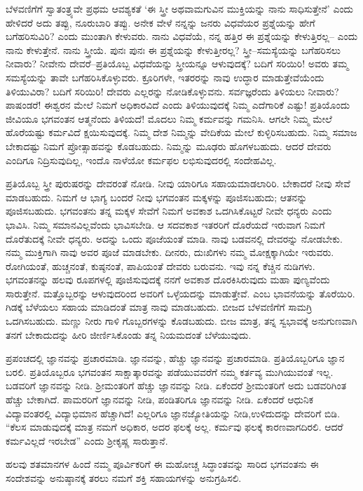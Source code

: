 ಬೆಳವಣಿಗೆಗೆ ಸ್ವಾತಂತ್ರ್ಯವೇ ಪ್ರಥಮ ಆವಶ್ಯಕತೆ ‘ಈ ಸ್ತ್ರೀ ಅಥವಾ\break ಮಗುವಿನ ಮುಕ್ತಿಯನ್ನು ನಾನು ಸಾಧಿಸುತ್ತೇನೆ’ ಎಂದು ಹೇಳಿದರೆ ಅದು ತಪ್ಪು, ನೂರುಬಾರಿ ತಪ್ಪು. ಅನೇಕ ವೇಳೆ ನನ್ನನ್ನು ಜನರು ವಿಧವೆಯರ ಪ್ರಶ್ನೆಯನ್ನು ಹೇಗೆ ಬಗೆಹರಿಸುವಿರಿ? ಎಂದು ಮುಂತಾಗಿ ಕೇಳುವರು. ನಾನು ವಿಧವೆಯೆ, ನನ್ನ ಹತ್ತಿರ ಈ ಪ್ರಶ್ನೆಯನ್ನು ಕೇಳುತ್ತಿರಲ್ಲ– ಎಂದು ನಾನು ಕೇಳುತ್ತೇನೆ. ನಾನು ಸ್ತ್ರೀಯೆ. ಪುನಃ ಪುನಃ ಈ ಪ್ರಶ್ನೆಯನ್ನು ಕೇಳುತ್ತೀರಲ್ಲ? ಸ್ತ್ರೀ–ಸಮಸ್ಯೆಯನ್ನು ಬಗೆಹರಿಸಲು ನೀವಾರು? ನೀವೇನು ದೇವರೆ–ಪ್ರತಿಯೊಬ್ಬ ವಿಧವೆಯನ್ನು ಸ್ತ್ರೀಯನ್ನೂ ಆಳುವುದಕ್ಕೆ? ಬದಿಗೆ ಸರಿಯಿರಿ! ಅವರು ತಮ್ಮ ಸಮಸ್ಯೆಯನ್ನು ತಾವೇ ಬಗೆಹರಿಸಿಕೊಳ್ಳುವರು. ಕ್ರೂರಿಗಳೇ, ಇತರರನ್ನು ನಾವು ಉದ್ಧಾರ ಮಾಡುತ್ತೇವೆಯೆಂದು ತಿಳಿಯುವಿರಾ? ಬದಿಗೆ ಸರಿಯಿರಿ! ದೇವರು ಎಲ್ಲರನ್ನು ನೋಡಿಕೊಳ್ಳುವನು. ಸರ್ವಜ್ಞರೆಂದು ತಿಳಿಯಲು ನೀವಾರು? ಪಾಷಂಡರೆ! ಈಶ್ವರನ ಮೇಲೆ ನಿಮಗೆ ಅಧಿಕಾರವಿದೆ ಎಂದು ತಿಳಿಯುವುದಕ್ಕೆ ನಿಮ್ಮ ಎದೆಗಾರಿಕೆ ಎಷ್ಟು! ಪ್ರತಿಯೊಂದು ಜೀವಿಯೂ ಭಗವಂತನ ಆತ್ಮನೆಂದು ತಿಳಿಯದೆ! ಮೊದಲು ನಿಮ್ಮ ಕರ್ಮವನ್ನು ಗಮನಿಸಿ. ಆಗಲೇ ನಿಮ್ಮ ಮೇಲೆ ಹೊರೆಯಷ್ಟು ಕರ್ಮವಿದೆ ಕ್ಷಯಿಸುವುದಕ್ಕೆ. ನಿಮ್ಮ ದೇಶ ನಿಮ್ಮನ್ನು ವೇದಿಕೆಯ ಮೇಲೆ ಕುಳ್ಳಿರಿಸಬಹುದು. ನಿಮ್ಮ ಸಮಾಜ ಬೇಕಾದಷ್ಟು ನಿಮಗೆ ಪ್ರೋತ್ಸಾಹವನ್ನು ಕೊಡಬಹುದು. ನಿಮ್ಮನ್ನು ಮೂಢರು ಹೊಗಳಬಹುದು. ಆದರೆ ದೇವರು ಎಂದಿಗೂ ನಿದ್ರಿಸುವುದಿಲ್ಲ, ಇಂದೊ ನಾಳೆಯೋ ಕರ್ಮಫಲ ಲಭಿಸುವುದರಲ್ಲಿ ಸಂದೇಹವಿಲ್ಲ.

ಪ್ರತಿಯೊಬ್ಬ ಸ್ತ್ರೀ ಪುರುಷರನ್ನು ದೇವರಂತೆ ನೋಡಿ. ನೀವು ಯಾರಿಗೂ ಸಹಾಯಮಾಡಲಾರಿರಿ. ಬೇಕಾದರೆ ನೀವು ಸೇವೆ ಮಾಡಬಹುದು. ನಿಮಗೆ ಆ ಭಾಗ್ಯ ಬಂದರೆ ನೀವು ಭಗವಂತನ ಮಕ್ಕಳನ್ನು ಪೂಜಿಸಬಹುದು; ಆತನನ್ನು ಪೂಜಿಸಬಹುದು. ಭಗವಂತನು ತನ್ನ ಮಕ್ಕಳ ಸೇವೆಗೆ ನಿಮಗೆ ಅವಕಾಶ ಒದಗಿಸಿಕೊಟ್ಟರೆ ನೀವೇ ಧನ್ಯರು ಎಂದು ಭಾವಿಸಿ. ನಿಮ್ಮ ಸಮಾನವಿಲ್ಲವೆಂದು ಭಾವಿಸಬೇಡಿ. ಆ ಸದವಕಾಶ ಇತರರಿಗೆ ದೊರೆಯದೆ ಇರುವಾಗ ನಿಮಗೆ ದೊರೆತುದಕ್ಕೆ ನೀವೇ ಧನ್ಯರು. ಅದನ್ನು ಒಂದು ಪೂಜೆಯಂತೆ ಮಾಡಿ. ನಾವು ಬಡವನಲ್ಲಿ ದೇವರನ್ನು ನೋಡಬೇಕು. ನಮ್ಮ ಮುಕ್ತಿಗಾಗಿ ನಾವು ಅವರ ಪೂಜೆ ಮಾಡಬೇಕು. ದೀನರು, ದುಃಖಿಗಳು ನಮ್ಮ ಮೋಕ್ಷಕ್ಕಾಗಿಯೇ ಇರುವರು. ರೋಗಿಯಂತೆ, ಹುಚ್ಚನಂತೆ, ಕುಷ್ಠನಂತೆ, ಪಾಪಿಯಂತೆ ದೇವರು ಬರುವನು. ಇವು ನನ್ನ ಕೆಚ್ಚಿನ ನುಡಿಗಳು. ಭಗವಂತನನ್ನು ಹಲವು ರೂಪಗಳಲ್ಲಿ ಪೂಜಿಸುವುದಕ್ಕೆ ನನಗೆ ಅವಕಾಶ ದೊರಕಿಸಿರುವುದು ಮಹಾ ಪುಣ್ಯವೆಂದು ಸಾರುತ್ತೇನೆ. ಮತ್ತೊಬ್ಬರನ್ನು ಆಳುವುದರಿಂದ ಅವರಿಗೆ ಒಳ್ಳೆಯದನ್ನು ಮಾಡುತ್ತೇವೆ. ಎಂಬ ಭಾವನೆಯನ್ನು ತೊರೆಯಿರಿ. ಗಿಡಕ್ಕೆ ಬೆಳೆಯಲು ಸಹಾಯ ಮಾಡಿದಂತೆ ಮಾತ್ರ ನಾವು ಮಾಡಬಹುದು. ಬೀಜದ ಬೆಳವಣಿಗೆಗೆ ಸಾಮಗ್ರಿ ಒದಗಿಸಬಹುದು. ಮಣ್ಣು ನೀರು ಗಾಳಿ ಗೊಬ್ಬರಗಳನ್ನು ಕೊಡಬಹುದು. ಬೀಜ ಮಾತ್ರ, ತನ್ನ ಸ್ವಭಾವಕ್ಕೆ ಅನುಗುಣವಾಗಿ ತನಗೆ ಬೇಕಾದುದನ್ನು ಹೀರಿ ಜೀರ್ಣಿಸಿಕೊಂಡು ತನ್ನ ನಿಯಮದಂತೆ ಬೆಳೆಯುವುದು.

ಪ್ರಪಂಚದಲ್ಲಿ ಜ್ಞಾನವನ್ನು ಪ್ರಚಾರಮಾಡಿ. ಜ್ಞಾನವನ್ನು, ಹೆಚ್ಚು ಜ್ಞಾನವನ್ನು ಪ್ರಚಾರಮಾಡಿ. ಪ್ರತಿಯೊಬ್ಬರಿಗೂ ಜ್ಞಾನ ಬರಲಿ. ಪ್ರತಿಯೊಬ್ಬರೂ ಭಗವಂತನ ಸಾಕ್ಷಾತ್ಕಾರವನ್ನು ಪಡೆಯುವವರೆಗೆ ನಮ್ಮ ಕರ್ತವ್ಯ ಮುಗಿಯುವಂತೆ ಇಲ್ಲ. ಬಡವರಿಗೆ ಜ್ಞಾನವನ್ನು ನೀಡಿ. ಶ‍್ರೀಮಂತರಿಗೆ ಹೆಚ್ಚು ಜ್ಞಾನವನ್ನು ನೀಡಿ. ಏಕೆಂದರೆ ಶ‍್ರೀಮಂತರಿಗೆ ಅದು ಬಡವರಿಗಿಂತ ಹೆಚ್ಚು ಬೇಕಾಗಿದೆ. ಪಾಮರರಿಗೆ ಜ್ಞಾನವನ್ನು ನೀಡಿ, ಪಂಡಿತರಿಗೂ ಜ್ಞಾನವನ್ನು ನೀಡಿ. ಏಕೆಂದರೆ ಆಧುನಿಕ ವಿದ್ಯಾವಂತರಲ್ಲಿ ವಿದ್ಯಾಭಿಮಾನ ಹೆಚ್ಚಾಗಿದೆ! ಎಲ್ಲರಿಗೂ ಜ್ಞಾನಜ್ಯೋತಿಯನ್ನು ನೀಡಿ,\break ಉಳಿದುದನ್ನು ದೇವರಿಗೆ ಬಿಡಿ. “ಕೆಲಸ ಮಾಡುವುದಕ್ಕೆ ಮಾತ್ರ ನಮಗೆ ಅಧಿಕಾರ, ಅದರ ಫಲಕ್ಕೆ ಅಲ್ಲ. ಕರ್ಮವು ಫಲಕ್ಕೆ ಕಾರಣವಾಗದಿರಲಿ. ಆದರೆ ಕರ್ಮವಿಲ್ಲದೆ ಇರಬೇಡ” ಎಂದು ಶ‍್ರೀಕೃಷ್ಣ ಸಾರುತ್ತಾನೆ.

ಹಲವು ಶತಮಾನಗಳ ಹಿಂದೆ ನಮ್ಮ ಪೂರ್ವಿಕರಿಗೆ ಈ ಮಹೋಚ್ಚ ಸಿದ್ಧಾಂತವನ್ನು ಸಾರಿದ ಭಗವಂತನು ಈ ಸಂದೇಶವನ್ನು ಅನುಷ್ಠಾನಕ್ಕೆ ತರಲು ನಮಗೆ ಶಕ್ತಿ ಸಹಾಯಗಳನ್ನು ಅನುಗ್ರಹಿಸಲಿ.


